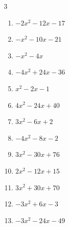 \begin{multicols}{3}
\begin{enumerate}

  \item $-2x^{2}-12x-17$


  \item $-x^{2}-10x-21$


  \item $-x^{2}-4x$


  \item $-4x^{2}+24x-36$


  \item $x^{2}-2x-1$


  \item $4x^{2}-24x+40$


  \item $3x^{2}-6x+2$


  \item $-4x^{2}-8x-2$


\columnbreak %

  \item $3x^{2}-30x+76$


  \item $2x^{2}-12x+15$


  \item $3x^{2}+30x+70$


  \item $-3x^{2}+6x-3$


  \item $-3x^{2}-24x-49$



\end{enumerate}
\end{multicols}
